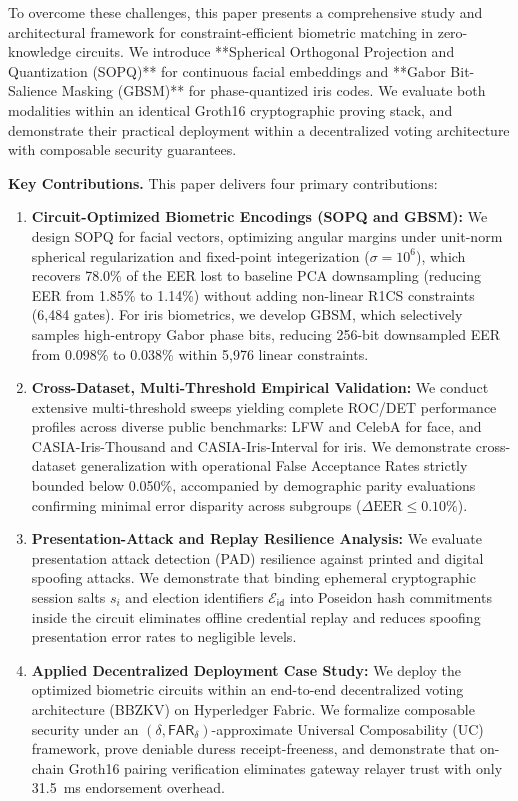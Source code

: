 \documentclass[10pt,letterpaper,journal]{IEEEtran}
\begin{document}
To overcome these challenges, this paper presents a comprehensive study and architectural framework for constraint-efficient biometric matching in zero-knowledge circuits. We introduce **Spherical Orthogonal Projection and Quantization (SOPQ)** for continuous facial embeddings and **Gabor Bit-Salience Masking (GBSM)** for phase-quantized iris codes. We evaluate both modalities within an identical Groth16 cryptographic proving stack, and demonstrate their practical deployment within a decentralized voting architecture with composable security guarantees.

\noindent\textbf{Key Contributions.} This paper delivers four primary contributions:
\begin{enumerate}[leftmargin=*,noitemsep,topsep=1pt,parsep=0pt]
    \item \textbf{Circuit-Optimized Biometric Encodings (SOPQ and GBSM):} We design SOPQ for facial vectors, optimizing angular margins under unit-norm spherical regularization and fixed-point integerization ($\sigma=10^6$), which recovers 78.0\% of the EER lost to baseline PCA downsampling (reducing EER from 1.85\% to 1.14\%) without adding non-linear R1CS constraints (6,484 gates). For iris biometrics, we develop GBSM, which selectively samples high-entropy Gabor phase bits, reducing 256-bit downsampled EER from 0.098\% to 0.038\% within 5,976 linear constraints.
    \item \textbf{Cross-Dataset, Multi-Threshold Empirical Validation:} We conduct extensive multi-threshold sweeps yielding complete ROC/DET performance profiles across diverse public benchmarks: LFW and CelebA for face, and CASIA-Iris-Thousand and CASIA-Iris-Interval for iris. We demonstrate cross-dataset generalization with operational False Acceptance Rates strictly bounded below 0.050\%, accompanied by demographic parity evaluations confirming minimal error disparity across subgroups ($\Delta\text{EER} \le 0.10\%$).
    \item \textbf{Presentation-Attack and Replay Resilience Analysis:} We evaluate presentation attack detection (PAD) resilience against printed and digital spoofing attacks. We demonstrate that binding ephemeral cryptographic session salts $s_i$ and election identifiers $\mathcal{E}_{\mathsf{id}}$ into Poseidon hash commitments inside the circuit eliminates offline credential replay and reduces spoofing presentation error rates to negligible levels.
    \item \textbf{Applied Decentralized Deployment Case Study:} We deploy the optimized biometric circuits within an end-to-end decentralized voting architecture (\textsc{BBZKV}) on Hyperledger Fabric. We formalize composable security under an $(\delta, \mathsf{FAR}_\delta)$-approximate Universal Composability (UC) framework, prove deniable duress receipt-freeness, and demonstrate that on-chain Groth16 pairing verification eliminates gateway relayer trust with only 31.5~ms endorsement overhead.
\end{enumerate}
\end{document}
